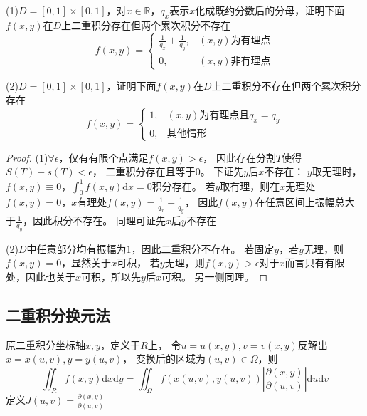 \begin{exercise}[两道经典题]
  (1)$D = [0,1] \times [0,1]$，对$x \in \mathbb{R}$，$q_x$表示$x$化成既约分数后的分母，证明下面$f(x,y)$在$D$上二重积分存在但两个累次积分不存在
  \begin{equation*}
    f(x,y) =
    \begin{cases}
      \frac{1}{q_x} + \frac{1}{q_y}, & (x,y)\text{为有理点}\\
      0, & (x,y)\text{非有理点}
    \end{cases}
  \end{equation*}

  (2)$D = [0,1] \times [0,1]$，证明下面$f(x,y)$在$D$上二重积分不存在但两个累次积分存在
  \begin{equation*}
    f(x,y) =
    \begin{cases}
      1, & (x,y)\text{为有理点且}q_x = q_y\\
      0, &\text{其他情形}
    \end{cases}
  \end{equation*}
\end{exercise}

\begin{proof}
  (1)$\forall \epsilon$，仅有有限个点满足$f(x,y) > \epsilon$，
  因此存在分割$T$使得$S(T) - s(T) < \epsilon$，
  二重积分存在且等于$0$。
  下证先$y$后$x$不存在：
  $y$取无理时，$f(x,y) \equiv 0$，$\int_0^1 f(x,y)\mathrm{d} x = 0$积分存在。
  若$y$取有理，则在$x$无理处$f(x,y) = 0$，$x$有理处$f(x,y) = \frac{1}{q_x} + \frac{1}{q_y}$，
  因此$f(x,y)$在任意区间上振幅总大于$\frac{1}{q_y}$，因此积分不存在。
  同理可证先$x$后$y$不存在

  (2)$D$中任意部分均有振幅为$1$，因此二重积分不存在。
  若固定$y$，若$y$无理，则$f(x,y) = 0$，显然关于$x$可积，
  若$y$无理，则$f(x,y) > \epsilon$对于$x$而言只有有限处，因此也关于$x$可积，所以先$y$后$x$可积。
  另一侧同理。
\end{proof}




\subsection{二重积分换元法}

\begin{theorem}[二重积分换元法]
  原二重积分坐标轴$x,y$，定义于$R$上，
  令$u = u(x,y), v = v(x,y)$反解出
  $x = x(u,v), y = y(u,v)$，
  变换后的区域为$(u,v) \in \Omega$，则
  \begin{equation*}
    \iint _R f(x,y) \mathrm{d}x \mathrm{d}y = \iint_{\Omega} f(x(u,v), y(u,v))\left\vert \frac{\partial (x,y)}{\partial (u,v)}\right\vert \mathrm{d}u \mathrm{d}v
  \end{equation*}
  定义$J(u,v) = \frac{\partial(x,y)}{\partial(u,v)}$
\end{theorem}

